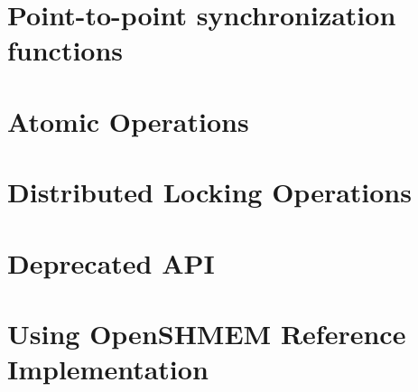 \documentclass[10pt]{book}
\begin{document}
\section*{Point-to-point synchronization functions}%
\startchap
\section*{Atomic Operations}
\startchap
\section*{Distributed Locking Operations}
\startchap
\section*{Deprecated API}
\startchap
\section*{ Using OpenSHMEM Reference Implementation}


\begin{acronym}

\end{acronym}
\end{document}
